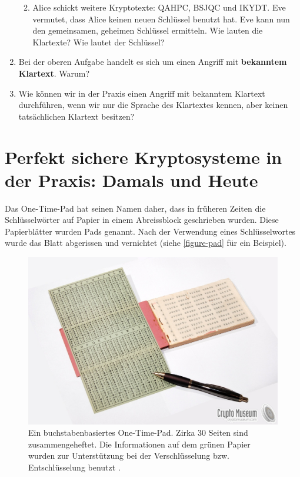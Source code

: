 \begin{enumerate}
\begin{enumerate}
			
			\fillwithgrid{1.5in}
			
		\item Alice schickt weitere Kryptotexte: QAHPC, BSJQC und IKYDT. Eve vermutet, dass Alice keinen neuen Schlüssel benutzt hat. Eve kann nun den gemeinsamen, geheimen Schlüssel ermitteln. Wie lauten die Klartexte? Wie lautet der Schlüssel?
		
		
		\fillwithgrid{2.5in}
		
	\end{enumerate}
	
	\item Bei der oberen Aufgabe handelt es sich um einen Angriff mit \textbf{bekanntem Klartext}. Warum?
	
	\fillwithgrid{0.75in}
	
	\item Wie können wir in der Praxis einen Angriff mit bekanntem Klartext durchführen, wenn wir nur die Sprache des Klartextes kennen, aber keinen tatsächlichen Klartext besitzen?

	
\end{enumerate}

\newpage

\section{Perfekt sichere Kryptosysteme in der Praxis: Damals und Heute}

Das One-Time-Pad hat seinen Namen daher, dass in früheren Zeiten die Schlüsselwörter auf Papier in einem Abreissblock geschrieben wurden. Diese Papierblätter wurden Pads genannt. Nach der Verwendung eines Schlüsselwortes wurde das Blatt abgerissen und vernichtet (siehe \autoref{figure-pad} für ein Beispiel).

\begin{figure}[htb]
	\centering
	\includegraphics[width=\textwidth]{otp_abreissblock}
	\caption{Ein buchstabenbasiertes One-Time-Pad. Zirka 30 Seiten sind zusammengeheftet. Die Informationen auf dem grünen Papier wurden zur Unterstützung bei der Verschlüsselung bzw. Entschlüsselung benutzt \cite{cryptomuseum2022onetimepad}.}
	\label{figure-pad}
\end{figure}


